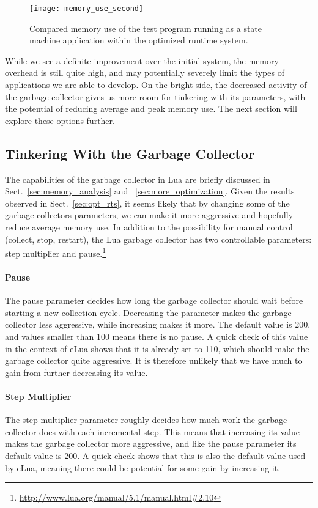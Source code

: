 \begin{figure}[htp]
	\centering
	\texttt{[image: memory\_use\_second]}
	\caption[Results of second memory overhead test]{Compared memory use of the test program running as a state machine application within the optimized runtime system.}
	\label{fig:memory_use_second}
\end{figure}

\noindent
While we see a definite improvement over the initial system, the memory overhead is still quite high, and may potentially severely limit the types of applications we are able to develop. On the bright side, the decreased activity of the garbage collector gives us more room for tinkering with its parameters, with the potential of reducing average and peak memory use. The next section will explore these options further.

\subsection{Tinkering With the Garbage Collector}
\label{sec:gc_tinkering}
The capabilities of the garbage collector in Lua are briefly discussed in Sect.~\ref{sec:memory_analysis} and ~\ref{sec:more_optimization}. Given the results observed in Sect.~\ref{sec:opt_rts}, it seems likely that by changing some of the garbage collectors parameters, we can make it more aggressive and hopefully reduce average memory use. In addition to the possibility for manual control (collect, stop, restart), the Lua garbage collector has two controllable parameters: step multiplier and pause.\footnote{\url{http://www.lua.org/manual/5.1/manual.html\#2.10}}

\paragraph{Pause} The pause parameter decides how long the garbage collector should wait before starting a new collection cycle. Decreasing the parameter makes the garbage collector less aggressive, while increasing makes it more. The default value is 200, and values smaller than 100 means there is no pause. A quick check of this value in the context of eLua shows that it is already set to 110, which should make the garbage collector quite aggressive. It is therefore unlikely that we have much to gain from further decreasing its value.

\paragraph{Step Multiplier} The step multiplier parameter roughly decides how much work the garbage collector does with each incremental step. This means that increasing its value makes the garbage collector more aggressive, and like the pause parameter its default value is 200. A quick check shows that this is also the default value used by eLua, meaning there could be potential for some gain by increasing it.

